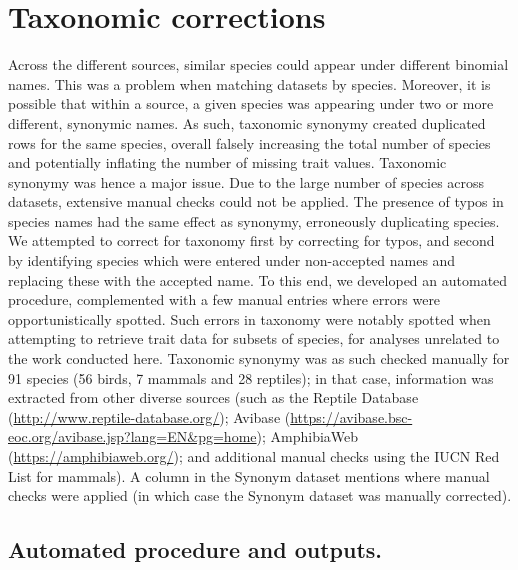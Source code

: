 \section{Taxonomic corrections}
Across the different sources, similar species could appear under different binomial names. This was a problem when matching datasets by species. Moreover, it is possible that within a source, a given species was appearing under two or more different, synonymic names. As such, taxonomic synonymy created duplicated rows for the same species, overall falsely increasing the total number of species and potentially inflating the number of missing trait values. Taxonomic synonymy was hence a major issue. Due to the large number of species across datasets, extensive manual checks could not be applied. The presence of typos in species names had the same effect as synonymy, erroneously duplicating species. We attempted to correct for taxonomy first by correcting for typos, and second by identifying species which were entered under non-accepted names and replacing these with the accepted name. To this end, we developed an automated procedure, complemented with a few manual entries where errors were opportunistically spotted. Such errors in taxonomy were notably spotted when attempting to retrieve trait data for subsets of species, for analyses unrelated to the work conducted here. Taxonomic synonymy was as such checked manually for 91 species (56 birds, 7 mammals and 28 reptiles); in that case, information was extracted from other diverse sources (such as the Reptile Database (\url{http://www.reptile-database.org/}); Avibase (\url{https://avibase.bsc-eoc.org/avibase.jsp?lang=EN\&pg=home}); AmphibiaWeb (\url{https://amphibiaweb.org/}); and additional manual checks using the IUCN Red List for mammals). A column in the Synonym dataset mentions where manual checks were applied (in which case the Synonym dataset was manually corrected). 


\subsection*{Automated procedure and outputs.}
